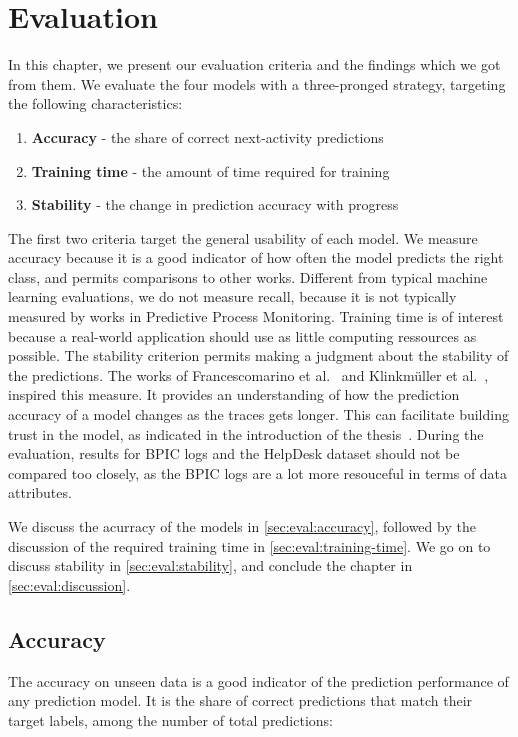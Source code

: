 \chapter{Evaluation}\label{chap:evaluation}
In this chapter, we present our evaluation criteria and the findings which we got from them.
We evaluate the four models with a three-pronged strategy, targeting the following characteristics:

\begin{enumerate}
    \item\textbf{Accuracy} - the share of correct next-activity predictions
    \item\textbf{Training time} - the amount of time required for training
    \item\textbf{Stability} - the change in prediction accuracy with progress
\end{enumerate}

The first two criteria target the general usability of each model.
We measure accuracy because it is a good indicator of how often the model predicts the right class, and permits comparisons to other works.
Different from typical machine learning evaluations, we do not measure recall, because it is not typically measured by works in Predictive Process Monitoring.
Training time is of interest because a real-world application should use as little computing ressources as possible.
The stability criterion permits making a judgment about the stability of the predictions. The works of Francescomarino et al.~\cite{francescomarino2015} and Klinkmüller et al.~\cite{klinkmuller2018reliablemonitoring}, inspired this measure. It provides an understanding of how the prediction accuracy of a model changes as the traces gets longer. This can facilitate building trust in the model, as indicated in the introduction of the thesis~\cite{klinkmuller2018reliablemonitoring, boehmer2018probability}.
During the evaluation, results for BPIC logs and the HelpDesk dataset should not be compared too closely, as the BPIC logs are a lot more resouceful in terms of data attributes.

We discuss the acurracy of the models in \autoref{sec:eval:accuracy}, followed by the discussion of the required training time in \autoref{sec:eval:training-time}. We go on to discuss stability in \autoref{sec:eval:stability}, and conclude the chapter in \autoref{sec:eval:discussion}.

\section{Accuracy}\label{sec:eval:accuracy}
The accuracy on unseen data is a good indicator of the prediction performance of any prediction model.
It is the share of correct predictions that match their target labels, among the number of total predictions:

